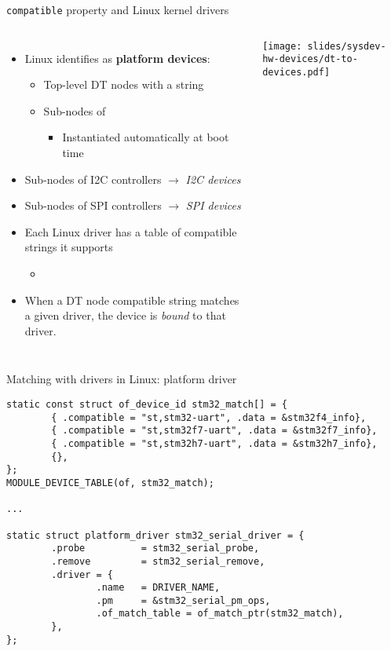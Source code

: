 \begin{frame}{{\tt compatible} property and Linux kernel drivers}
  \begin{columns}
    \begin{itemize}
    \item Linux identifies as {\bf platform devices}:
      \begin{itemize}
      \item Top-level DT nodes with a  string
      \item Sub-nodes of 
        \begin{itemize}
        \item Instantiated automatically at boot time
        \end{itemize}
      \end{itemize}
    \item Sub-nodes of I2C controllers $\rightarrow$ {\em I2C devices}
    \item Sub-nodes of SPI controllers $\rightarrow$ {\em SPI devices}
    \item Each Linux driver has a table of compatible strings it supports
      \begin{itemize}
      \item {}\code{[]}
      \end{itemize}
    \item When a DT node compatible string matches a given driver, the
      device is {\em bound} to that driver.
    \end{itemize}
    \texttt{[image: slides/sysdev-hw-devices/dt-to-devices.pdf]}
  \end{columns}
\end{frame}

\begin{frame}[fragile]{Matching with drivers in Linux: platform driver}
  \begin{block}{}
    {\tiny
\begin{verbatim}
static const struct of_device_id stm32_match[] = {
        { .compatible = "st,stm32-uart", .data = &stm32f4_info},
        { .compatible = "st,stm32f7-uart", .data = &stm32f7_info},
        { .compatible = "st,stm32h7-uart", .data = &stm32h7_info},
        {},
};
MODULE_DEVICE_TABLE(of, stm32_match);

...

static struct platform_driver stm32_serial_driver = {
        .probe          = stm32_serial_probe,
        .remove         = stm32_serial_remove,
        .driver = {
                .name   = DRIVER_NAME,
                .pm     = &stm32_serial_pm_ops,
                .of_match_table = of_match_ptr(stm32_match),
        },
};
\end{verbatim}
    }
  \end{block}
\end{frame}

